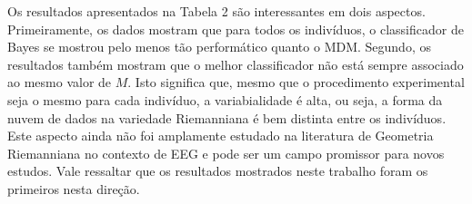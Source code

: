 \documentclass[a4paper,titlepage]{article}
\begin{document}
\begin{center}
  \vspace{1em}
  \vspace{1em}
\end{center}

Os resultados apresentados na Tabela 2 são interessantes em dois aspectos.
Primeiramente, os dados mostram que para todos os indivíduos, o classificador de
Bayes se mostrou pelo menos tão performático quanto o MDM\@. Segundo, os
resultados também mostram que o melhor classificador não está sempre associado
ao mesmo valor de $M$. Isto significa que, mesmo que o procedimento experimental
seja o mesmo para cada indivíduo, a variabialidade é alta, ou seja, a forma da
nuvem de dados na variedade Riemanniana é bem distinta entre os indivíduos.
Este aspecto ainda não foi amplamente estudado na literatura de Geometria
Riemanniana no contexto de EEG e pode ser um campo promissor para novos
estudos. Vale ressaltar que os resultados mostrados neste trabalho foram os
primeiros nesta direção.

\begin{center}
  \vspace{1em}
  \vspace{1em}
\end{center}
\end{document}
